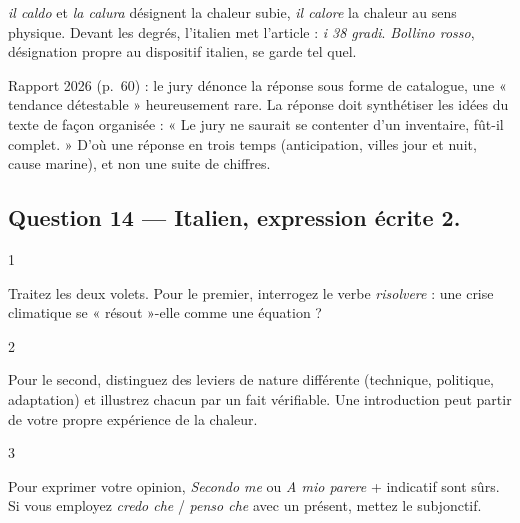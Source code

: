 \documentclass[11pt,a4paper]{article}
\begin{document}
\begin{piege}

\emph{il caldo} et \emph{la calura} désignent la chaleur subie, \emph{il calore} la chaleur au sens physique. Devant les degrés, l'italien met l'article : \emph{i 38 gradi}. \emph{Bollino rosso}, désignation propre au dispositif italien, se garde tel quel.

\end{piege}

\begin{jury}

Rapport 2026 (p.~60) : le jury dénonce la réponse sous forme de catalogue, une « tendance détestable » heureusement rare. La réponse doit synthétiser les idées du texte de façon organisée : « Le jury ne saurait se contenter d'un inventaire, fût-il complet. » D'où une réponse en trois temps (anticipation, villes jour et nuit, cause marine), et non une suite de chiffres.

\end{jury}

\hypertarget{question-14-italien-expression-uxe9crite-2.}{%
\subsection{Question 14 --- Italien, expression écrite 2.}\label{question-14-italien-expression-uxe9crite-2.}}

\begin{indication}{1}

Traitez les deux volets. Pour le premier, interrogez le verbe \emph{risolvere} : une crise climatique se « résout »-elle comme une équation ?

\end{indication}

\begin{indication}{2}

Pour le second, distinguez des leviers de nature différente (technique, politique, adaptation) et illustrez chacun par un fait vérifiable. Une introduction peut partir de votre propre expérience de la chaleur.

\end{indication}

\begin{indication}{3}

Pour exprimer votre opinion, \emph{Secondo me} ou \emph{A mio parere} + indicatif sont sûrs. Si vous employez \emph{credo che} / \emph{penso che} avec un présent, mettez le subjonctif.

\end{indication}
\end{document}
